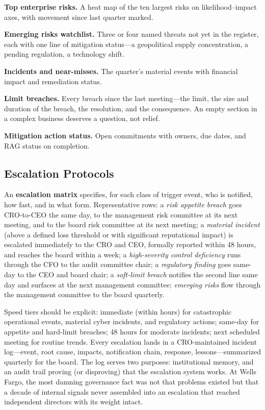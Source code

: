 \documentclass[11pt,openany]{book}
\begin{document}
\textbf{Top enterprise risks.} A heat map of the ten largest risks on
likelihood--impact axes, with movement since last quarter marked.

\textbf{Emerging risks watchlist.} Three or four named threats not yet in the
register, each with one line of mitigation status---a geopolitical supply
concentration, a pending regulation, a technology shift.

\textbf{Incidents and near-misses.} The quarter's material events with
financial impact and remediation status.

\textbf{Limit breaches.} Every breach since the last meeting---the limit, the
size and duration of the breach, the resolution, and the consequence. An
empty section in a complex business deserves a question, not relief.

\textbf{Mitigation action status.} Open commitments with owners, due dates,
and RAG status on completion.

\subsection{Escalation Protocols}

An \textbf{escalation matrix} specifies, for each class of trigger event, who
is notified, how fast, and in what form. Representative rows: a \emph{risk
appetite breach} goes CRO-to-CEO the same day, to the management risk
committee at its next meeting, and to the board risk committee at its next
meeting; a \emph{material incident} (above a defined loss threshold or with
significant reputational impact) is escalated immediately to the CRO and CEO,
formally reported within 48 hours, and reaches the board within a week; a
\emph{high-severity control deficiency} runs through the CFO to the audit
committee chair; a \emph{regulatory finding} goes same-day to the CEO and
board chair; a \emph{soft-limit breach} notifies the second line same day and
surfaces at the next management committee; \emph{emerging risks} flow through
the management committee to the board quarterly.

Speed tiers should be explicit: immediate (within hours) for catastrophic
operational events, material cyber incidents, and regulatory actions;
same-day for appetite and hard-limit breaches; 48 hours for moderate
incidents; next scheduled meeting for routine trends. Every escalation lands
in a CRO-maintained incident log---event, root cause, impacts, notification
chain, response, lessons---summarized quarterly for the board. The log serves
two purposes: institutional memory, and an audit trail proving (or
disproving) that the escalation system works. At Wells Fargo, the most
damning governance fact was not that problems existed but that a decade of
internal signals never assembled into an escalation that reached independent
directors with its weight intact.
\end{document}

